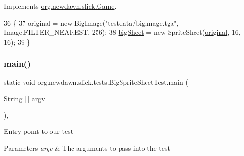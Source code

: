 Implements \mbox{\hyperlink{interfaceorg_1_1newdawn_1_1slick_1_1_game_ad2dd6affab08bb8fdb5fab0815957b7a}{org.\+newdawn.\+slick.\+Game}}.


\begin{DoxyCode}
36                                                                     \{
37         \mbox{\hyperlink{classorg_1_1newdawn_1_1slick_1_1tests_1_1_big_sprite_sheet_test_a861b104e8a265dc23a36e0a55e8d368e}{original}} = \textcolor{keyword}{new} BigImage(\textcolor{stringliteral}{"testdata/bigimage.tga"}, Image.FILTER\_NEAREST, 256);
38         \mbox{\hyperlink{classorg_1_1newdawn_1_1slick_1_1tests_1_1_big_sprite_sheet_test_a676326fb3aeb2466aed58dc794d5bb66}{bigSheet}} = \textcolor{keyword}{new} SpriteSheet(\mbox{\hyperlink{classorg_1_1newdawn_1_1slick_1_1tests_1_1_big_sprite_sheet_test_a861b104e8a265dc23a36e0a55e8d368e}{original}}, 16, 16);
39     \}
\end{DoxyCode}
\mbox{\label{classorg_1_1newdawn_1_1slick_1_1tests_1_1_big_sprite_sheet_test_a4bff0fcaf8adbcbe31ccaa26253f68ad}} 
\subsubsection{\texorpdfstring{main()}{main()}}
{\footnotesize\ttfamily static void org.\+newdawn.\+slick.\+tests.\+Big\+Sprite\+Sheet\+Test.\+main (\begin{DoxyParamCaption}\item[{String \mbox{[}$\,$\mbox{]}}]{argv }\end{DoxyParamCaption})\hspace{0.3cm}{\ttfamily [inline]}, {\ttfamily [static]}}

Entry point to our test


\begin{DoxyParams}{Parameters}
{\em argv} & The arguments to pass into the test \\
\hline
\end{DoxyParams}

